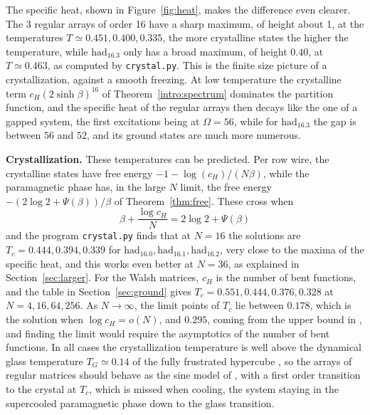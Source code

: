 \documentclass[11pt,a4paper]{article}
\theoremstyle{remark}
\begin{document}
The specific heat, shown in Figure~\ref{fig:heat}, makes the difference even clearer. The 3 regular arrays of order 16 have a sharp maximum, of height about 1, at the temperatures $T\simeq0.451,0.400,0.335$, the more crystalline states the higher the temperature, while $\mathrm{had}_{16.3}$ only has a broad maximum, of height $0.40$, at $T\simeq0.463$, as computed by \texttt{crystal.py}. This is the finite size picture of a crystallization, against a smooth freezing. At low temperature the crystalline term $c_H(2\sinh\beta)^{16}$ of Theorem~\ref{intro:spectrum} dominates the partition function, and the specific heat of the regular arrays then decays like the one of a gapped system, the first excitations being at $\Omega=56$, while for $\mathrm{had}_{16.3}$ the gap is between $56$ and $52$, and its ground states are much more numerous.

\medskip

\noindent\textbf{Crystallization.} These temperatures can be predicted. Per row wire, the crystalline states have free energy $-1-\log(c_H)/(N\beta)$, while the paramagnetic phase has, in the large $N$ limit, the free energy $-(2\log2+\Psi(\beta))/\beta$ of Theorem~\ref{thm:free}. These cross when
\[
 \beta+\frac{\log c_H}{N}=2\log2+\Psi(\beta)
\]
and the program \texttt{crystal.py} finds that at $N=16$ the solutions are $T_c=0.444,0.394,0.339$ for $\mathrm{had}_{16.0},\mathrm{had}_{16.1},\mathrm{had}_{16.2}$, very close to the maxima of the specific heat, and this works even better at $N=36$, as explained in Section~\ref{sec:larger}. For the Walsh matrices, $c_H$ is the number of bent functions, and the table in Section~\ref{sec:ground} gives $T_c=0.551,0.444,0.376,0.328$ at $N=4,16,64,256$. As $N\to\infty$, the limit points of $T_c$ lie between $0.178$, which is the solution when $\log c_H=o(N)$, and $0.295$, coming from the upper bound in \cite{pot}, and finding the limit would require the asymptotics of the number of bent functions. In all cases the crystallization temperature is well above the dynamical glass temperature $T_G\simeq0.14$ of the fully frustrated hypercube \cite{mp3}, so the arrays of regular matrices should behave as the sine model of \cite{mp2}, with a first order transition to the crystal at $T_c$, which is missed when cooling, the system staying in the supercooled paramagnetic phase down to the glass transition.
\end{document}
